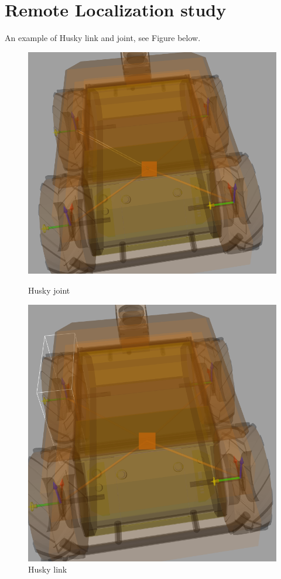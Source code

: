 \documentclass[11pt,a4paper]{article}
\begin{document}

%
%



\section{Remote Localization study} \label{sec:res}

An example of Husky link and joint, see Figure below.

\begin{figure}[!h]
    \centering
    \begin{minipage}{.5\textwidth}
        \centering
        \includegraphics[width=0.7\linewidth, height=0.2\textheight]{figures/husky_joint}
        \caption{Husky joint}
        \label{fig:}
    \end{minipage}%
    \begin{minipage}{0.5\textwidth}
        \centering
        \includegraphics[width=0.7\linewidth, height=0.2\textheight]{figures/husky_link}
        \caption{Husky link}
        \label{fig:}
    \end{minipage}
 \end{figure}
\end{document}
